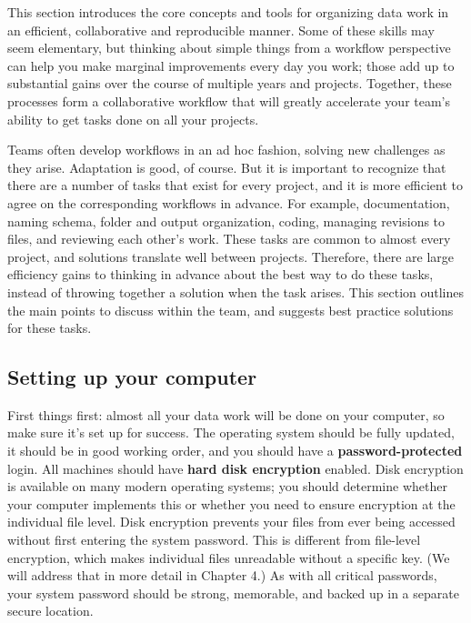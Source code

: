This section introduces the core concepts and tools
for organizing data work in an efficient, collaborative and reproducible manner.
Some of these skills may seem elementary,
but thinking about simple things from a workflow perspective
can help you make marginal improvements every day you work;
those add up to substantial gains over the course of multiple years and projects.
Together, these processes form a collaborative workflow
that will greatly accelerate your team's ability to get tasks done
on all your projects.

Teams often develop workflows in an ad hoc fashion,
solving new challenges as they arise.
Adaptation is good, of course. 
But it is important to recognize
that there are a number of tasks that exist for every project,
and it is more efficient to agree on the corresponding workflows in advance.
For example, documentation, naming schema, folder and output organization, 
coding, managing revisions to files, and reviewing each other's work.
These tasks are common to almost every project,
and solutions translate well between projects.
Therefore, there are large efficiency gains to 
thinking in advance about the best way to do these tasks,
instead of throwing together a solution when the task arises.
This section outlines the main points to discuss within the team,
and suggests best practice solutions for these tasks.

\subsection{Setting up your computer}

First things first: 
almost all your data work will be done on your computer,
so make sure it's set up for success.
The operating system should be fully updated,
it should be in good working order,
and you should have a \textbf{password-protected} login.
All machines should have \textbf{hard disk encryption} enabled.
Disk encryption is available on many modern operating systems;
you should determine whether your computer implements this
or whether you need to ensure encryption at the individual file level.
Disk encryption prevents your files from ever being accessed
without first entering the system password.
This is different from file-level encryption,
which makes individual files unreadable without a specific key.
(We will address that in more detail in Chapter 4.)
As with all critical passwords, your system password should be strong,
memorable, and backed up in a separate secure location.

